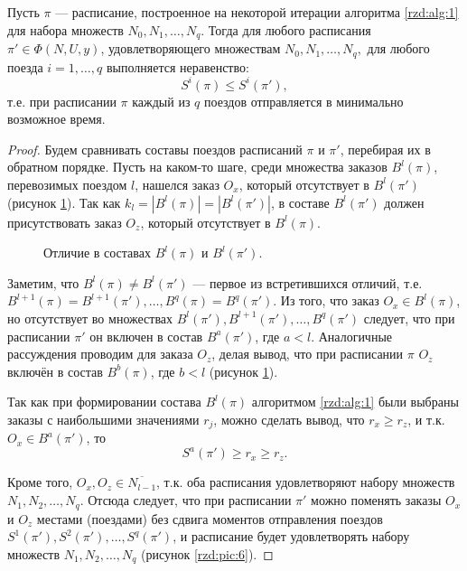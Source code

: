 \normalsize
\begin{lemma}\label{rzd:lm:2}
Пусть $\pi$ --- расписание, построенное на некоторой итерации алгоритма \ref{rzd:alg:1} для набора множеств $N_0, N_1, \dots, N_q$. Тогда для любого расписания $\pi' \in \Phi(N,U,y)$, удовлетворяющего множествам $N_0, N_1, \dots, N_q,$ для любого поезда $i = 1, \dots, q$ выполняется неравенство:
$$S^i(\pi) \leq S^i(\pi'),$$
т.е. при расписании $\pi$ каждый из $q$ поездов отправляется в минимально возможное время.
\end{lemma}

\begin{proof}
Будем сравнивать составы поездов расписаний $\pi$ и $\pi'$, перебирая их в обратном порядке. Пусть на каком-то шаге, среди множества заказов $B^l(\pi)$, перевозимых поездом $l$, нашелся заказ $O_x$, который отсутствует в $B^l(\pi')$ (рисунок \ref{rzd:pic:5}). Так как $k_l = |B^l(\pi)| = |B^l(\pi')|$, в составе $B^l(\pi')$ должен присутствовать заказ $O_z$, который отсутствует в $B^l(\pi)$.

\begin{figure}[h!]
\caption{Отличие в составах $B^l(\pi)$ и $B^l(\pi')$.}
\label{rzd:pic:5}
\end{figure}

Заметим, что $B^l(\pi) \neq B^l(\pi')$ --- первое из встретившихся отличий, т.е. $B^{l+1}(\pi) = B^{l+1}(\pi'), \dots, B^{q}(\pi) = B^{q}(\pi')$. Из того, что заказ $O_x \in B^l(\pi)$, но отсутствует во множествах $B^l(\pi'), B^{l+1}(\pi'), \dots, B^q(\pi')$ следует, что при расписании $\pi'$ он включен в состав $B^a(\pi')$, где $a < l$. Аналогичные рассуждения проводим для заказа $O_z$, делая вывод, что при расписании $\pi$ $O_z$ включён в состав $B^b(\pi)$, где $b < l$ (рисунок \ref{rzd:pic:5}).

Так как при формировании состава $B^l(\pi)$ алгоритмом \ref{rzd:alg:1} были выбраны заказы с наибольшими значениями $r_j$, можно сделать вывод, что $r_{x} \geq r_{z}$, и т.к. $O_x \in B^a(\pi')$, то
$$S^a(\pi') \geq r_{x} \geq r_{z}.$$

Кроме того, $O_x, O_z \in \overline{N_{l-1}}$, т.к. оба расписания удовлетворяют набору множеств $N_1, N_2, \dots, N_q$. Отсюда следует, что при расписании $\pi'$ можно поменять заказы $O_x$ и $O_z$ местами (поездами) без сдвига моментов отправления поездов $S^1(\pi'), S^2(\pi'), \dots, S^q(\pi')$, и расписание будет удовлетворять набору множеств $N_1, N_2, \dots, N_q$ (рисунок \ref{rzd:pic:6}).


\end{proof}
